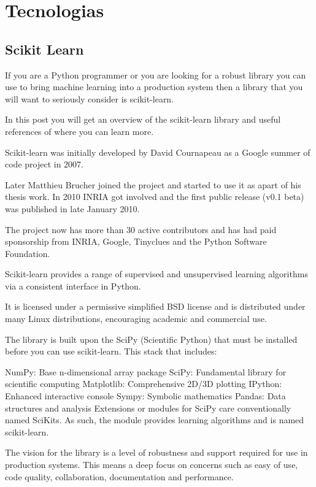 \section{Tecnologias}

\subsection{Scikit Learn}

If you are a Python programmer or you are looking for a robust library you can use to bring machine learning into a production system then a library that you will want to seriously consider is scikit-learn.

In this post you will get an overview of the scikit-learn library and useful references of where you can learn more.

Scikit-learn was initially developed by David Cournapeau as a Google summer of code project in 2007.

Later Matthieu Brucher joined the project and started to use it as apart of his thesis work. In 2010 INRIA got involved and the first public release (v0.1 beta) was published in late January 2010.

The project now has more than 30 active contributors and has had paid sponsorship from INRIA, Google, Tinyclues and the Python Software Foundation.

Scikit-learn provides a range of supervised and unsupervised learning algorithms via a consistent interface in Python.

It is licensed under a permissive simplified BSD license and is distributed under many Linux distributions, encouraging academic and commercial use.

The library is built upon the SciPy (Scientific Python) that must be installed before you can use scikit-learn. This stack that includes:

NumPy: Base n-dimensional array package
SciPy: Fundamental library for scientific computing
Matplotlib: Comprehensive 2D/3D plotting
IPython: Enhanced interactive console
Sympy: Symbolic mathematics
Pandas: Data structures and analysis
Extensions or modules for SciPy care conventionally named SciKits. As such, the module provides learning algorithms and is named scikit-learn.

The vision for the library is a level of robustness and support required for use in production systems. This means a deep focus on concerns such as easy of use, code quality, collaboration, documentation and performance.

